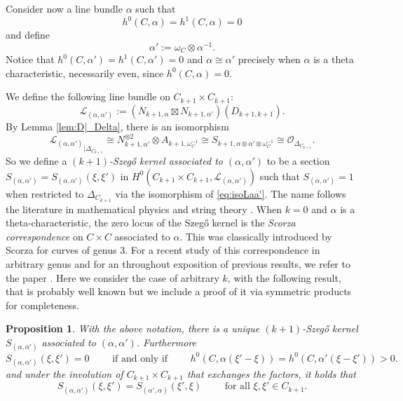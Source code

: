 \documentclass[12pt]{amsart}
\newcounter{thmcounter}
\numberwithin{equation}{section}
\numberwithin{thmcounter}{section}
\newtheorem{proposition}[thmcounter]{Proposition}
\theoremstyle{definition}
\theoremstyle{claim}
\newcommand{\sO}{\mathscr{O}}
\newcommand{\sL}{\mathscr{L}}
\begin{document}
\noindent
Consider now a line bundle $\alpha$ such that
\[  h^0(C,\alpha) = h^1(C,\alpha) = 0 \]
and define
\[ \alpha' := \omega_C\otimes \alpha^{-1}. \]
Notice that $h^0(C,\alpha')=h^1(C,\alpha')=0$ and  $\alpha\cong \alpha'$ precisely when $\alpha$ is a theta characteristic, necessarily even, since $h^0(C,\alpha)=0$.


We define the following line bundle on $C_{k+1}\times C_{k+1}$:
\[ \sL_{(\alpha,\alpha')} := (N_{k+1,\alpha}\boxtimes N_{k+1,\alpha'})(D_{k+1,k+1}). \]
By Lemma \ref{lem:D|_Delta}, there is an isomorphism
\begin{equation}\label{eq:isoLaa'}
{\sL_{(\alpha,\alpha')}}_{|\Delta_{C_{k+1}}} \cong N_{k+1,\alpha'}^{\otimes 2} \otimes A_{k+1,\omega_C^{-1}}  \cong S_{k+1,\alpha \otimes \alpha' \otimes \omega_C^{-1}} \cong \sO_{\Delta_{C_{k+1}}}.
\end{equation}
So we define a \emph{$(k+1)$-Szeg\H{o} kernel associated to $(\alpha,\alpha')$} to be a section $S_{(\alpha,\alpha')} = S_{(\alpha,\alpha')}(\xi,\xi')$ in $H^0(C_{k+1}\times C_{k+1}, \sL_{(\alpha,\alpha')})$ such that ${S_{(\alpha,\alpha')}} = 1$ when restricted to $\Delta_{C_{k+1}}$ via the isomorphism of \eqref{eq:isoLaa'}. The name follows the literature in mathematical physics and string theory \cite{DHP,Fay,raina,Wi}. When $k=0$ and $\alpha$ is a theta-characteristic, the zero locus of the  Szeg\H{o} kernel is the \emph{Scorza correspondence} on $C\times C$ associated to $\alpha$. This was classically introduced by Scorza for curves of genus $3$. For a recent study of this correspondence in arbitrary genus and for an throughout exposition of previous results, we refer to the paper  \cite{FI}. Here we consider the case of arbitrary $k$, with the following result, that is probably well known but we include a proof of it via symmetric products for completeness.

\begin{proposition}\label{prop:szego}
	With the above notation, there is a unique $(k+1)$-Szeg\H{o} kernel $S_{(\alpha,\alpha')}$ associated to $(\alpha,\alpha')$. Furthermore
	\[ S_{(\alpha,\alpha')}(\xi,\xi')= 0 \qquad  \text{ if and only if } \qquad  h^0(C,\alpha(\xi'-\xi)) = h^0(C,\alpha'(\xi-\xi')) >0.   \]
	and under the involution of $C_{k+1}\times C_{k+1}$ that exchanges the factors, it holds that
	\[ S_{(\alpha,\alpha')}(\xi,\xi') = S_{(\alpha',\alpha)}(\xi',\xi) \qquad  \text{ for all } \xi,\xi'\in C_{k+1}. \]
\end{proposition}
\end{document}
